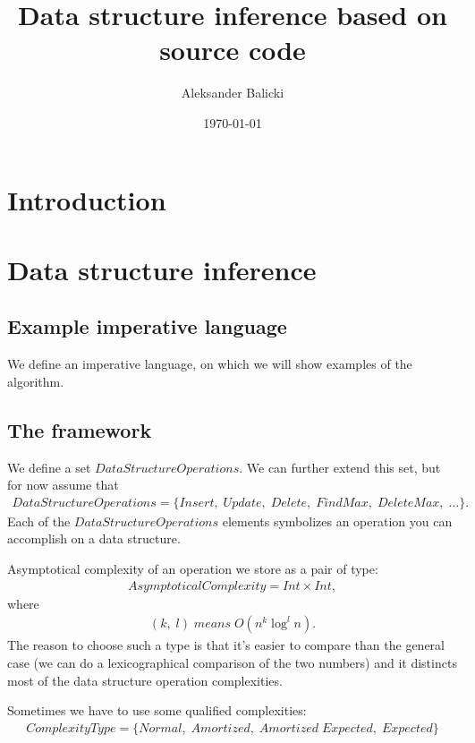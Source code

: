 \documentclass[11pt]{article}
\title{Data structure inference based on source code}
\author{Aleksander Balicki}
\date{\today}
\begin{document}
\maketitle

\begin{abstract}
\end{abstract}

\section{Introduction}

\section{Data structure inference}
	\subsection{Example imperative language}
		We define an imperative language, on which we will show examples of the algorithm.
	\subsection{The framework}
	   	We define a set $DataStructureOperations$. We can further extend this set, but for now assume that
		\begin{eqnarray}
		  	DataStructureOperations = \{Insert, \; Update, \; Delete, \; FindMax,\; DeleteMax, \; \dots\}.
		\end{eqnarray}
		Each of the $DataStructureOperations$ elements symbolizes an operation you can accomplish on a data structure.

		Asymptotical complexity of an operation we store as a pair of type:
		\begin{eqnarray}
			AsymptoticalComplexity = Int \times Int,
		\end{eqnarray}
		where
		\begin{eqnarray}
			(k, \; l) \; means \; O(n^k \log^l{ n}).
		\end{eqnarray}
		The reason to choose such a type is that it's easier to compare than the general case (we can do a lexicographical comparison of the two numbers) and it distincts most of the data structure operation complexities.
		
		Sometimes we have to use some qualified complexities:
		\begin{eqnarray}
			ComplexityType = \{ Normal, \; Amortized, \; Amortized \;Expected, \; Expected \}
		\end{eqnarray}
\end{document}
